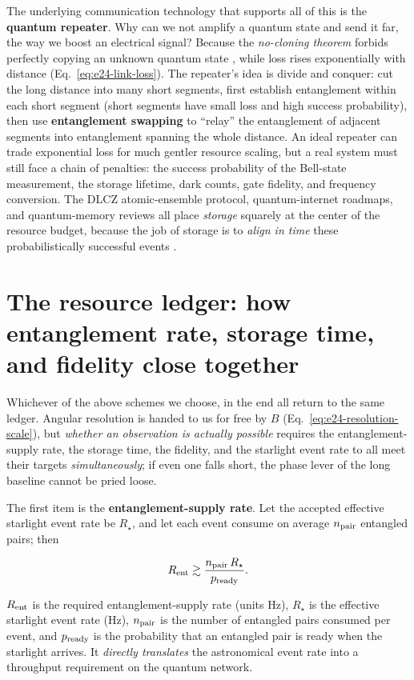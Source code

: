 The underlying communication technology that supports all of this is the \textbf{quantum repeater}. Why can we not amplify a quantum state and send it far, the way we boost an electrical signal? Because the \emph{no-cloning theorem} forbids perfectly copying an unknown quantum state \citep{1982Natur.299..802W}, while loss rises exponentially with distance (Eq.\ \eqref{eq:e24-link-loss}). The repeater's idea is divide and conquer: cut the long distance into many short segments, first establish entanglement within each short segment (short segments have small loss and high success probability), then use \textbf{entanglement swapping} to ``relay'' the entanglement of adjacent segments into entanglement spanning the whole distance. An ideal repeater can trade exponential loss for much gentler resource scaling, but a real system must still face a chain of penalties: the success probability of the Bell-state measurement, the storage lifetime, dark counts, gate fidelity, and frequency conversion. The DLCZ atomic-ensemble protocol, quantum-internet roadmaps, and quantum-memory reviews all place \emph{storage} squarely at the center of the resource budget, because the job of storage is to \emph{align in time} these probabilistically successful events \citep{1998PhRvL..81.5932B,2001Natur.414..413D,2011RvMP...83...33S,2008Natur.453.1023K,2012IEEEN..26d..59V,2006quant.ph..7182U}.

\section{The resource ledger: how entanglement rate, storage time, and fidelity close together}
\label{sec:e24-budget}

Whichever of the above schemes we choose, in the end all return to the same ledger. Angular resolution is handed to us for free by \(B\) (Eq.\ \eqref{eq:e24-resolution-scale}), but \emph{whether an observation is actually possible} requires the entanglement-supply rate, the storage time, the fidelity, and the starlight event rate to all meet their targets \emph{simultaneously}; if even one falls short, the phase lever of the long baseline cannot be pried loose.

The first item is the \textbf{entanglement-supply rate}. Let the accepted effective starlight event rate be \(R_\star\), and let each event consume on average \(n_{\rm pair}\) entangled pairs; then

\begin{equation}
  R_{\rm ent}
  \gtrsim
  \frac{n_{\rm pair}\,R_\star}{p_{\rm ready}} .
  \label{eq:e24-entanglement-rate}
\end{equation}
\begin{formulaexplain}
\(R_{\rm ent}\) is the required entanglement-supply rate (units Hz), \(R_\star\) is the effective starlight event rate (Hz), \(n_{\rm pair}\) is the number of entangled pairs consumed per event, and \(p_{\rm ready}\) is the probability that an entangled pair is ready when the starlight arrives. It \emph{directly translates} the astronomical event rate into a throughput requirement on the quantum network.
\end{formulaexplain}


